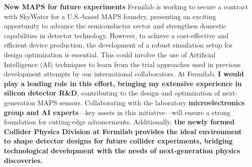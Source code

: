 {\begin{flushleft}
\textbf{New MAPS for future experiments}
Fermilab is working to secure a contract with SkyWater for a U.S.-based MAPS foundry, presenting an exciting opportunity to advance the semiconductor sector and strengthen domestic capabilities in detector technology. However, to achieve a cost-effective and efficient device production, the development of a robust simulation setup for design optimization is essential. This could involve the use of Artificial Intelligence (AI) techniques to learn from the trial approaches used in previous development attempts by our international collaborators. %
At Fermilab, {\bf I would play a leading role in this effort, bringing my extensive experience in silicon detector R\&D}, contributing to the design and optimization of next-generation MAPS sensors. Collaborating with the laboratory {\bf microelectronics group and AI experts}—key assets in this initiative—will ensure a strong foundation for cutting-edge advancements. Additionally, \textbf{the newly formed Collider Physics Division at Fermilab provides the ideal environment to shape detector designs for future collider experiments, bridging technological development with the needs of next-generation physics discoveries.}


 




\end{flushleft}}
